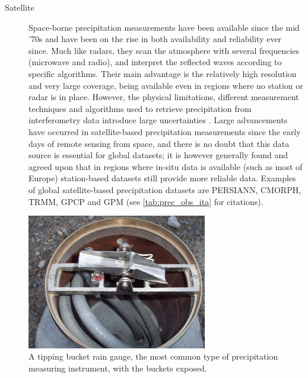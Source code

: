 \begin{description}
    \item[Satellite] Space-borne precipitation measurements \citep[see][for an overview]{Kidd2011} have been available since the mid ’70s and have been on the rise in both availability and reliability ever since. Much like radars, they scan the atmosphere with several frequencies (microwave and radio), and interpret the reflected waves according to specific algorithms. Their main advantage is the relatively high resolution and very large coverage, being available even in regions where no station or radar is in place. However, the physical limitations, different measurement techniques and algorithms used to retrieve precipitation from interferometry data introduce large uncertainties \citep{Sarachi2015, Maggioni2016, Bartsotas2018, Tian2010, Bytheway2013}. Large advancements have occurred in satellite-based precipitation measurements since the early days of remote sensing from space, and there is no doubt that this data source is essential for global datasets; it is however generally found and agreed upon \citep{Rossi2017, Prein2017, Gao2013, Bowman2005} that in regions where in-situ data is available (such as most of Europe) station-based datasets still provide more reliable data. Examples of global satellite-based precipitation datasets are PERSIANN, CMORPH, TRMM, GPCP and GPM (see \cref{tab:prec_obs_ita} for citations).
\end{description}

\begin{figure}
    \centering
    \includegraphics[width=0.7\textwidth]{figures/tipping_bucket}
    \decoRule
    \caption[Tipping bucket rain gauge]{A tipping bucket rain gauge, the most common type of precipitation measuring instrument,  with the buckets exposed.}
    \label{fig:tipping_bucket}
\end{figure}

